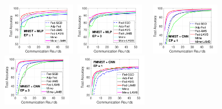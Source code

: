 \documentclass[nohyperref]{article}
\theoremstyle{plain}
\theoremstyle{definition}
\theoremstyle{remark}
\begin{document}
\begin{figure}[t]

\vspace{-0.1in}

    \begin{center}
        \mbox{
        \hspace{-0.1in}\includegraphics[width=0.26\textwidth]{figure_mime/mnist_testerror_mlp_ep1_iid1_mime.pdf}
        \hspace{-0.1in}\includegraphics[width=0.26\textwidth]{figure_mime/mnist_testerror_mlp_ep3_iid1_mime.pdf}
                }
        \mbox{
        \hspace{-0.1in}\includegraphics[width=0.26\textwidth]{figure_mime/mnist_testerror_cnn_ep1_iid1_mime.pdf}
        \hspace{-0.1in}\includegraphics[width=0.26\textwidth]{figure_mime/mnist_testerror_cnn_ep3_iid1_mime.pdf}
                }
        \mbox{
        \hspace{-0.1in}\includegraphics[width=0.26\textwidth]{figure_mime/fmnist_testerror_cnn_ep1_iid1_mime.pdf}
}
\end{center}
\end{figure}
\end{document}
